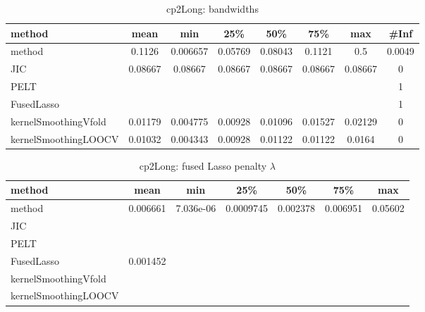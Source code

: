 \begin{table}[ht]
\centering
\begin{tabular}{l|c|ccccc|c}
  \hline
method & mean & min & 25\% & 50\% & 75\% & max & \#Inf \\ 
  \hline
method & 0.1126 & 0.006657 & 0.05769 & 0.08043 & 0.1121 &   0.5 & 0.0049 \\ 
  JIC & 0.08667 & 0.08667 & 0.08667 & 0.08667 & 0.08667 & 0.08667 &   0 \\ 
  PELT &  &  &  &  &  &  &   1 \\ 
  FusedLasso &  &  &  &  &  &  &   1 \\ 
  kernelSmoothingVfold & 0.01179 & 0.004775 & 0.00928 & 0.01096 & 0.01527 & 0.02129 &   0 \\ 
  kernelSmoothingLOOCV & 0.01032 & 0.004343 & 0.00928 & 0.01122 & 0.01122 & 0.0164 &   0 \\ 
   \hline
\end{tabular}
\caption{cp2Long: bandwidths} 
\label{tab:cp2LongBandwidths}
\end{table}
\begin{table}[ht]
\centering
\begin{tabular}{l|c|ccccc}
  \hline
method & mean & min & 25\% & 50\% & 75\% & max \\ 
  \hline
method & 0.006661 & 7.036e-06 & 0.0009745 & 0.002378 & 0.006951 & 0.05602 \\ 
  JIC &  &  &  &  &  &  \\ 
  PELT &  &  &  &  &  &  \\ 
  FusedLasso & 0.001452 &  &  &  &  &  \\ 
  kernelSmoothingVfold &  &  &  &  &  &  \\ 
  kernelSmoothingLOOCV &  &  &  &  &  &  \\ 
   \hline
\end{tabular}
\caption{cp2Long: fused Lasso penalty $\lambda$} 
\label{tab:cp2LongLambdas}
\end{table}
